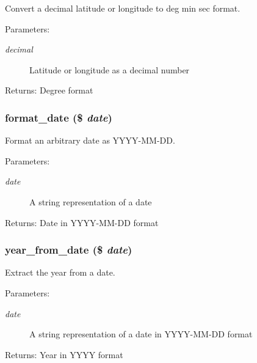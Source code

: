 Convert a decimal latitude or longitude to deg min sec format. 

\begin{Desc}
\item[Parameters:]
\begin{description}
\item[{\em decimal}]Latitude or longitude as a decimal number\end{description}
\end{Desc}
\begin{Desc}
\item[Returns:]Degree format \end{Desc}
\hypertarget{utils_8php_ac671b7526e88db82a81d2dbc528aff7}{
\subsubsection{\setlength{\rightskip}{0pt plus 5cm}format\_\-date (\$ {\em date})}}
\label{utils_8php_ac671b7526e88db82a81d2dbc528aff7}


Format an arbitrary date as YYYY-MM-DD. 

\begin{Desc}
\item[Parameters:]
\begin{description}
\item[{\em date}]A string representation of a date\end{description}
\end{Desc}
\begin{Desc}
\item[Returns:]Date in YYYY-MM-DD format \end{Desc}
\hypertarget{utils_8php_2553ac15032d0429d0fa3d92ccebf937}{
\subsubsection{\setlength{\rightskip}{0pt plus 5cm}year\_\-from\_\-date (\$ {\em date})}}
\label{utils_8php_2553ac15032d0429d0fa3d92ccebf937}


Extract the year from a date. 

\begin{Desc}
\item[Parameters:]
\begin{description}
\item[{\em date}]A string representation of a date in YYYY-MM-DD format \end{description}
\end{Desc}
\begin{Desc}
\item[Returns:]Year in YYYY format \end{Desc}
